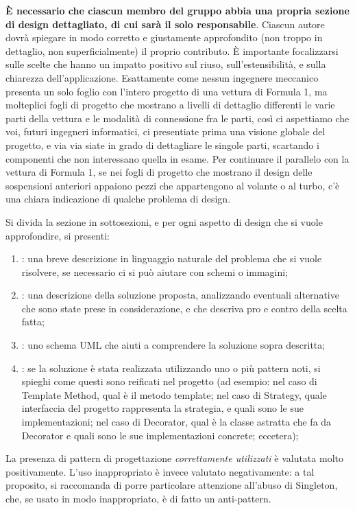 \documentclass[a4paper,12pt]{report}
\begin{document}
\textbf{È necessario che ciascun membro del gruppo abbia una propria sezione di design dettagliato,
di cui sarà il solo responsabile}.
%
Ciascun autore dovrà spiegare in modo corretto e giustamente approfondito (non troppo in dettaglio, non superficialmente) il proprio contributo.
%
È importante focalizzarsi sulle scelte che hanno un impatto positivo sul riuso, sull'estensibilità, e sulla chiarezza dell'applicazione.
%
Esattamente come nessun ingegnere meccanico presenta un solo foglio con l'intero progetto di una vettura di Formula 1, ma molteplici fogli di progetto che mostrano a livelli di dettaglio differenti le varie parti della vettura e le modalità di connessione fra le parti, così ci aspettiamo che voi, futuri ingegneri informatici, ci presentiate prima una visione globale del progetto, e via via siate in grado di dettagliare le singole parti, scartando i componenti che non interessano quella in esame.
%
Per continuare il parallelo con la vettura di Formula 1, se nei fogli di progetto che mostrano il
design delle sospensioni anteriori appaiono pezzi che appartengono al volante o al turbo, c'è una
chiara indicazione di qualche problema di design.

Si divida la sezione in sottosezioni, e per ogni aspetto di design che si vuole approfondire, si presenti:
\begin{enumerate}
    \item: una breve descrizione in linguaggio naturale del problema che si vuole risolvere, se necessario ci si può aiutare con schemi o immagini;
    \item: una descrizione della soluzione proposta, analizzando eventuali alternative che sono state prese in considerazione, e che descriva pro e contro della scelta fatta;
    \item: uno schema UML che aiuti a comprendere la soluzione sopra descritta;
    \item: se la soluzione è stata realizzata utilizzando uno o più pattern noti, si spieghi come questi sono reificati nel progetto
    (ad esempio: nel caso di Template Method, qual è il metodo template;
    nel caso di Strategy, quale interfaccia del progetto rappresenta la strategia, e quali sono le sue implementazioni;
    nel caso di Decorator, qual è la classe astratta che fa da Decorator e quali sono le sue implementazioni concrete; eccetera);
\end{enumerate}
%
La presenza di pattern di progettazione \emph{correttamente utilizzati} è valutata molto positivamente.
%
L'uso inappropriato è invece valutato negativamente: a tal proposito, si raccomanda di porre particolare attenzione all'abuso di Singleton, che, se usato in modo inappropriato, è di fatto un anti-pattern.
\end{document}
